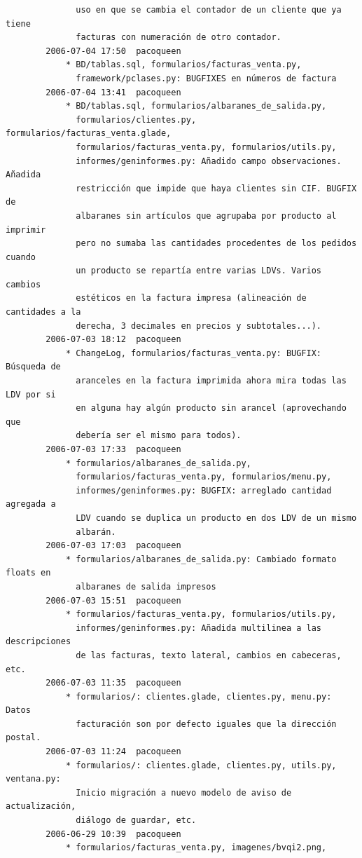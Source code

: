 \documentclass[a4paper]{article}
\begin{document}
\begin{verbatim}
              uso en que se cambia el contador de un cliente que ya tiene
              facturas con numeración de otro contador.
        2006-07-04 17:50  pacoqueen
            * BD/tablas.sql, formularios/facturas_venta.py,
              framework/pclases.py: BUGFIXES en números de factura
        2006-07-04 13:41  pacoqueen
            * BD/tablas.sql, formularios/albaranes_de_salida.py,
              formularios/clientes.py, formularios/facturas_venta.glade,
              formularios/facturas_venta.py, formularios/utils.py,
              informes/geninformes.py: Añadido campo observaciones. Añadida
              restricción que impide que haya clientes sin CIF. BUGFIX de
              albaranes sin artículos que agrupaba por producto al imprimir
              pero no sumaba las cantidades procedentes de los pedidos cuando
              un producto se repartía entre varias LDVs. Varios cambios
              estéticos en la factura impresa (alineación de cantidades a la
              derecha, 3 decimales en precios y subtotales...).
        2006-07-03 18:12  pacoqueen
            * ChangeLog, formularios/facturas_venta.py: BUGFIX: Búsqueda de
              aranceles en la factura imprimida ahora mira todas las LDV por si
              en alguna hay algún producto sin arancel (aprovechando que
              debería ser el mismo para todos).
        2006-07-03 17:33  pacoqueen
            * formularios/albaranes_de_salida.py,
              formularios/facturas_venta.py, formularios/menu.py,
              informes/geninformes.py: BUGFIX: arreglado cantidad agregada a
              LDV cuando se duplica un producto en dos LDV de un mismo
              albarán.
        2006-07-03 17:03  pacoqueen
            * formularios/albaranes_de_salida.py: Cambiado formato floats en
              albaranes de salida impresos
        2006-07-03 15:51  pacoqueen
            * formularios/facturas_venta.py, formularios/utils.py,
              informes/geninformes.py: Añadida multilinea a las descripciones
              de las facturas, texto lateral, cambios en cabeceras, etc.
        2006-07-03 11:35  pacoqueen
            * formularios/: clientes.glade, clientes.py, menu.py: Datos
              facturación son por defecto iguales que la dirección postal.
        2006-07-03 11:24  pacoqueen
            * formularios/: clientes.glade, clientes.py, utils.py, ventana.py:
              Inicio migración a nuevo modelo de aviso de actualización,
              diálogo de guardar, etc.
        2006-06-29 10:39  pacoqueen
            * formularios/facturas_venta.py, imagenes/bvqi2.png,

\end{verbatim}
\end{document}

